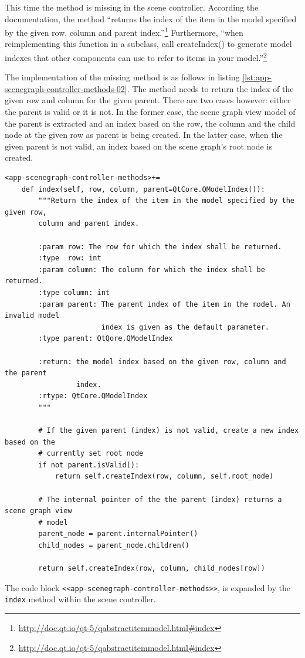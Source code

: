 \documentclass[10pt, openright, notitlepage]{scrreprt}
\newcommand{\myverb}{\collectverb{\fcolorbox{black!50}{black!25}}}
\begin{document}
This time the \myverb{index} method is missing in the scene controller.
According the documentation, the method ``returns the index of the item in the
model specified by the given row, column and parent
index.''\footnote{\url{http://doc.qt.io/qt-5/qabstractitemmodel.html\#index}}
Furthermore, ``when reimplementing this function in a subclass, call
createIndex() to generate model indexes that other components can use to refer
to items in your
model.''\footnote{\url{http://doc.qt.io/qt-5/qabstractitemmodel.html\#index}}

The implementation of the missing method \myverb{index} is as follows in
listing \ref{lst:app-scenegraph-controller-methods-02}. The method needs to return the
index of the given row and column for the given parent. There are two cases
however: either the parent is valid or it is not. In the former case, the scene
graph view model of the parent is extracted and an index based on the row, the
column and the child node at the given row as parent is being created. In the
latter case, when the given parent is not valid, an index based on the scene
graph's root node is created.

\begin{listing}[H]
\begin{verbatim}
<app-scenegraph-controller-methods>+=
    def index(self, row, column, parent=QtCore.QModelIndex()):
        """Return the index of the item in the model specified by the given row,
        column and parent index.
    
        :param row: The row for which the index shall be returned.
        :type  row: int
        :param column: The column for which the index shall be returned.
        :type column: int
        :param parent: The parent index of the item in the model. An invalid model
                       index is given as the default parameter.
        :type parent: QtQore.QModelIndex
    
        :return: the model index based on the given row, column and the parent
                 index.
        :rtype: QtCore.QModelIndex
        """
    
        # If the given parent (index) is not valid, create a new index based on the
        # currently set root node
        if not parent.isValid():
            return self.createIndex(row, column, self.root_node)
    
        # The internal pointer of the the parent (index) returns a scene graph view
        # model
        parent_node = parent.internalPointer()
        child_nodes = parent_node.children()
    
        return self.createIndex(row, column, child_nodes[row])
\end{verbatim}
\caption{\label{lst:app-scenegraph-controller-methods-02}
The code block \texttt{<<app-scenegraph-controller-methods>>}, is expanded by the \texttt{index} method within the scene controller.}
\end{listing}
\end{document}
